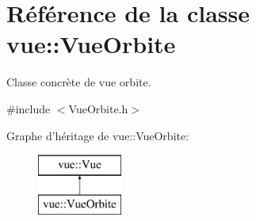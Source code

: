 \hypertarget{classvue_1_1_vue_orbite}{\section{Référence de la classe vue\-:\-:Vue\-Orbite}
\label{classvue_1_1_vue_orbite}
}


Classe concrète de vue orbite.  




{\ttfamily \#include $<$Vue\-Orbite.\-h$>$}

Graphe d'héritage de vue\-:\-:Vue\-Orbite\-:\begin{figure}[H]
\begin{center}
\leavevmode
\includegraphics[height=2.000000cm]{classvue_1_1_vue_orbite}
\end{center}
\end{figure}
